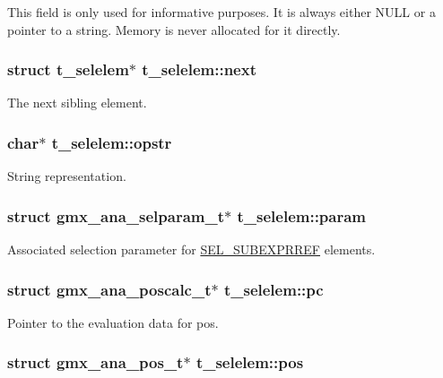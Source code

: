 \-This field is only used for informative purposes. \-It is always either \-N\-U\-L\-L or a pointer to a string. \-Memory is never allocated for it directly. \hypertarget{structt__selelem_aa083abd2a03676e7eab479081390f600}{
\subsubsection[{next}]{\setlength{\rightskip}{0pt plus 5cm}struct {\bf t\-\_\-selelem}$\ast$ {\bf t\-\_\-selelem\-::next}}}\label{structt__selelem_aa083abd2a03676e7eab479081390f600}
\-The next sibling element. \hypertarget{structt__selelem_afca0d677a7b5ae84a571a4e344d37456}{
\subsubsection[{opstr}]{\setlength{\rightskip}{0pt plus 5cm}char$\ast$ {\bf t\-\_\-selelem\-::opstr}}}\label{structt__selelem_afca0d677a7b5ae84a571a4e344d37456}
\-String representation. \hypertarget{structt__selelem_aa5e5c027ad2dbb7f02948b797e79b226}{
\subsubsection[{param}]{\setlength{\rightskip}{0pt plus 5cm}struct {\bf gmx\-\_\-ana\-\_\-selparam\-\_\-t}$\ast$ {\bf t\-\_\-selelem\-::param}}}\label{structt__selelem_aa5e5c027ad2dbb7f02948b797e79b226}
\-Associated selection parameter for \hyperlink{selelem_8h_a1f104d5c71b1198ef51acc4ef016ae46af3e44c019a776df8511a73457f9b32b4}{\-S\-E\-L\-\_\-\-S\-U\-B\-E\-X\-P\-R\-R\-E\-F} elements. \hypertarget{structt__selelem_a2ee93956d30023a0317ce9fd6130cfca}{
\subsubsection[{pc}]{\setlength{\rightskip}{0pt plus 5cm}struct {\bf gmx\-\_\-ana\-\_\-poscalc\-\_\-t}$\ast$ {\bf t\-\_\-selelem\-::pc}}}\label{structt__selelem_a2ee93956d30023a0317ce9fd6130cfca}
\-Pointer to the evaluation data for {\ttfamily pos}. \hypertarget{structt__selelem_af589106f31e3e1cf9c7efe106270747c}{
\subsubsection[{pos}]{\setlength{\rightskip}{0pt plus 5cm}struct {\bf gmx\-\_\-ana\-\_\-pos\-\_\-t}$\ast$ {\bf t\-\_\-selelem\-::pos}}}\label{structt__selelem_af589106f31e3e1cf9c7efe106270747c}

